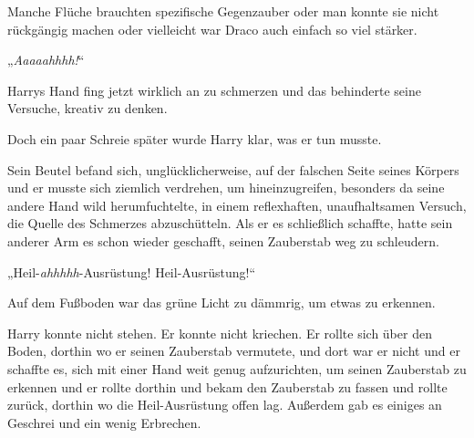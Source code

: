 Manche Flüche brauchten spezifische Gegenzauber oder man konnte sie nicht rückgängig machen oder vielleicht war Draco auch einfach so viel stärker.

„\emph{Aaaaahhhh!}“

Harrys Hand fing jetzt wirklich an zu schmerzen und das behinderte seine Versuche, kreativ zu denken.

Doch ein paar Schreie später wurde Harry klar, was er tun musste.

Sein Beutel befand sich, unglücklicherweise, auf der falschen Seite seines Körpers und er musste sich ziemlich verdrehen, um hineinzugreifen, besonders da seine andere Hand wild herumfuchtelte, in einem reflexhaften, unaufhaltsamen Versuch, die Quelle des Schmerzes abzuschütteln. Als er es schließlich schaffte, hatte sein anderer Arm es schon wieder geschafft, seinen Zauberstab weg zu schleudern.

„Heil-\emph{ahhhhh}-Ausrüstung! Heil-Ausrüstung!“

Auf dem Fußboden war das grüne Licht zu dämmrig, um etwas zu erkennen.

Harry konnte nicht stehen. Er konnte nicht kriechen. Er rollte sich über den Boden, dorthin wo er seinen Zauberstab vermutete, und dort war er nicht und er schaffte es, sich mit einer Hand weit genug aufzurichten, um seinen Zauberstab zu erkennen und er rollte dorthin und bekam den Zauberstab zu fassen und rollte zurück, dorthin wo die Heil-Ausrüstung offen lag. Außerdem gab es einiges an Geschrei und ein wenig Erbrechen.

